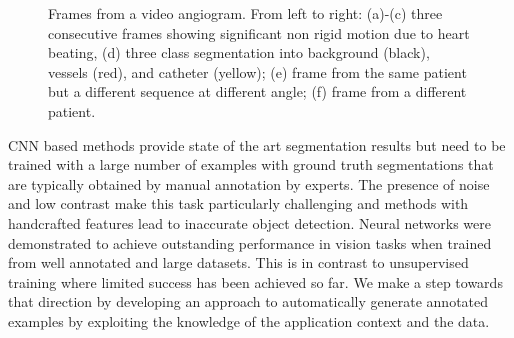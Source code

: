 \documentclass{bmvc2k}
\begin{document}
	\begin{figure}[h]
		\begin{adjustbox}{width=\textwidth}
			
			
			
			
			\caption{Frames from a video angiogram. From left to right: (a)-(c) three consecutive frames showing significant non rigid motion due to heart beating, (d) three class segmentation into background (black), vessels (red), and catheter (yellow);  (e) frame from the same patient but a different sequence at different angle; (f) frame from a different patient.}
			\label{illustration}
		\end{adjustbox}
		
	\end{figure}
	CNN based methods provide state of the art segmentation results but need to be trained with a large number of examples with ground truth segmentations  that are typically obtained by manual annotation by experts. The presence of noise and low contrast make this task particularly challenging and methods with handcrafted features lead to inaccurate object detection. Neural networks were demonstrated to achieve outstanding performance in vision tasks when trained from well annotated and large datasets. This is in contrast to unsupervised training where limited success has been achieved so far. We make a step towards that direction by developing an approach to automatically generate annotated examples by exploiting the knowledge of the application context and the data.
	
\end{document}
